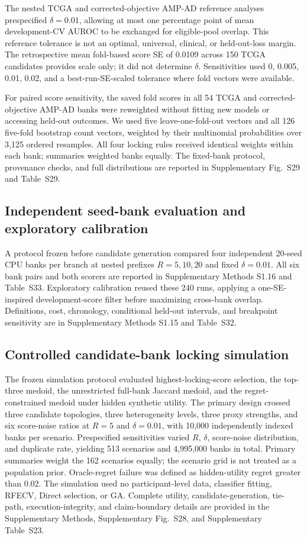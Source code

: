 The nested TCGA and corrected-objective AMP-AD reference analyses prespecified $\delta=0.01$, allowing at most one percentage point of mean development-CV AUROC to be exchanged for eligible-pool overlap. This reference tolerance is not an optimal, universal, clinical, or held-out-loss margin. The retrospective mean fold-based score SE of 0.0109 across 150 TCGA candidates provides scale only; it did not determine $\delta$. Sensitivities used 0, 0.005, 0.01, 0.02, and a best-run-SE-scaled tolerance where fold vectors were available.

For paired score sensitivity, the saved fold scores in all 54 TCGA and corrected-objective AMP-AD banks were reweighted without fitting new models or accessing held-out outcomes. We used five leave-one-fold-out vectors and all 126 five-fold bootstrap count vectors, weighted by their multinomial probabilities over 3,125 ordered resamples. All four locking rules received identical weights within each bank; summaries weighted banks equally. The fixed-bank protocol, provenance checks, and full distributions are reported in Supplementary Fig.~S29 and Table~S29.

\subsection{Independent seed-bank evaluation and exploratory calibration}

A protocol frozen before candidate generation compared four independent 20-seed CPU banks per branch at nested prefixes $R=5,10,20$ and fixed $\delta=0.01$. All six bank pairs and both scorers are reported in Supplementary Methods S1.16 and Table~S33. Exploratory calibration reused these 240 runs, applying a one-SE-inspired development-score filter \citep{ref53} before maximizing cross-bank overlap. Definitions, cost, chronology, conditional held-out intervals, and breakpoint sensitivity are in Supplementary Methods S1.15 and Table~S32.

\subsection{Controlled candidate-bank locking simulation}

The frozen simulation protocol evaluated highest-locking-score selection, the top-three medoid, the unrestricted full-bank Jaccard medoid, and the regret-constrained medoid under hidden synthetic utility. The primary design crossed three candidate topologies, three heterogeneity levels, three proxy strengths, and six score-noise ratios at $R=5$ and $\delta=0.01$, with 10,000 independently indexed banks per scenario. Prespecified sensitivities varied $R$, $\delta$, score-noise distribution, and duplicate rate, yielding 513 scenarios and 4,995,000 banks in total. Primary summaries weight the 162 scenarios equally; the scenario grid is not treated as a population prior. Oracle-regret failure was defined as hidden-utility regret greater than 0.02. The simulation used no participant-level data, classifier fitting, RFECV, Direct selection, or GA. Complete utility, candidate-generation, tie-path, execution-integrity, and claim-boundary details are provided in the Supplementary Methods, Supplementary Fig.~S28, and Supplementary Table~S23.

